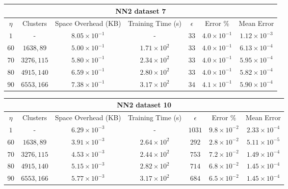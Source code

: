 \par\null\par
\par\null\par

\begin{adjustwidth}{-1cm}{}
\begin{tabular}{ccccccc}
\hline
\multicolumn{7}{c}{NN2 dataset 7} \\
\toprule
$\eta$ & Clusters & Space Overhead (KB) & Training Time (s) & $\epsilon$ & Error \% & Mean Error\\
\midrule
$1$ & - & $8.05 \times 10^{-1}$ & - & $33$ & $4.0 \times 10^{-1}$ & $1.12 \times 10^{-3}$\\
$60$ & $1638, 89$ & $5.00 \times 10^{-1}$ & $1.71 \times 10^2$ & $33$ & $4.0 \times 10^{-1}$ & $6.13 \times 10^{-4}$\\
$70$ & $3276, 115$ & $5.80 \times 10^{-1}$ & $2.34 \times 10^2$ & $33$ & $4.0 \times 10^{-1}$ & $5.95 \times 10^{-4}$\\
$80$ & $4915, 140$ & $6.59 \times 10^{-1}$ & $2.80 \times 10^2$ & $33$ & $4.0 \times 10^{-1}$ & $5.82 \times 10^{-4}$\\
$90$ & $6553, 166$ & $7.38 \times 10^{-1}$ & $3.17 \times 10^2$ & $34$ & $4.1 \times 10^{-1}$ & $5.90 \times 10^{-4}$\\
\bottomrule
\end{tabular}
\end{adjustwidth}

\par\null\par
\par\null\par

\begin{adjustwidth}{-1cm}{}
\begin{tabular}{ccccccc}
\hline
\multicolumn{7}{c}{NN2 dataset 10} \\
\toprule
$\eta$ & Clusters & Space Overhead (KB) & Training Time (s) & $\epsilon$ & Error \% & Mean Error\\
\midrule
$1$ & - & $6.29 \times 10^{-3}$ & - & $1031$ & $9.8 \times 10^{-2}$ & $2.33 \times 10^{-4}$\\
$60$ & $1638, 89$ & $3.91 \times 10^{-3}$ & $2.64 \times 10^2$ & $292$ & $2.8 \times 10^{-2}$ & $5.11 \times 10^{-5}$\\
$70$ & $3276, 115$ & $4.53 \times 10^{-3}$ & $2.44 \times 10^2$ & $753$ & $7.2 \times 10^{-2}$ & $1.49 \times 10^{-4}$\\
$80$ & $4915, 140$ & $5.15 \times 10^{-3}$ & $2.82 \times 10^2$ & $714$ & $6.8 \times 10^{-2}$ & $1.45 \times 10^{-4}$\\
$90$ & $6553, 166$ & $5.77 \times 10^{-3}$ & $3.17 \times 10^2$ & $684$ & $6.5 \times 10^{-2}$ & $1.45 \times 10^{-4}$\\
\bottomrule
\end{tabular}
\end{adjustwidth}

